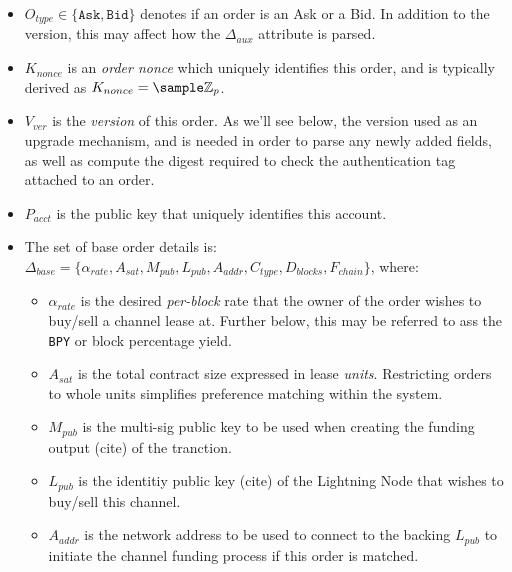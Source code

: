 \documentclass[12pt,a4paper]{article}
\theoremstyle{definition}
\begin{document}
\begin{itemize}
    \item $O_{type} \in \{\texttt{Ask}, \texttt{Bid}\}$ denotes if an order is
        an Ask or a Bid. In addition to the version, this may affect how the
        $\Delta_{aux}$ attribute is parsed.

    \item $K_{nonce}$ is an \emph{order nonce} which uniquely identifies this
        order, and is typically derived as $K_{nonce} = \sample
        \mathbb{Z}_{p}$.

    \item $V_{ver}$ is the \emph{version} of this order. As we'll see below,
        the version used as an upgrade mechanism, and is needed in order to
        parse any newly added fields, as well as compute the digest required to
        check the authentication tag attached to an order.

    \item $P_{acct}$ is the public key that uniquely identifies this account.

    \item The set of base order details is: \\ $\Delta_{base} = \{
        \alpha_{rate}, A_{sat}, M_{pub}, L_{pub}, A_{addr}, C_{type},
    D_{blocks}, F_{chain} \}$, where:

    \begin{itemize}

        \item $\alpha_{rate}$ is the desired \emph{per-block} rate that the owner
            of the order wishes to buy/sell a channel lease at. Further below, this
            may be referred to ass the \texttt{BPY} or block percentage yield.

        \item $A_{sat}$ is the total contract size expressed in lease \emph{units}.
            Restricting orders to whole units simplifies preference matching within
            the system.

        \item $M_{pub}$ is the multi-sig public key to be used when creating
            the funding output (cite) of the tranction. %

        \item $L_{pub}$ is the identitiy public key (cite) of the Lightning
            Node that wishes to buy/sell this channel.

        \item $A_{addr}$ is the network address to be used to connect to the
            backing $L_{pub}$ to initiate the channel funding process if this
            order is matched. %


\end{itemize}
\end{itemize}
\end{document}
